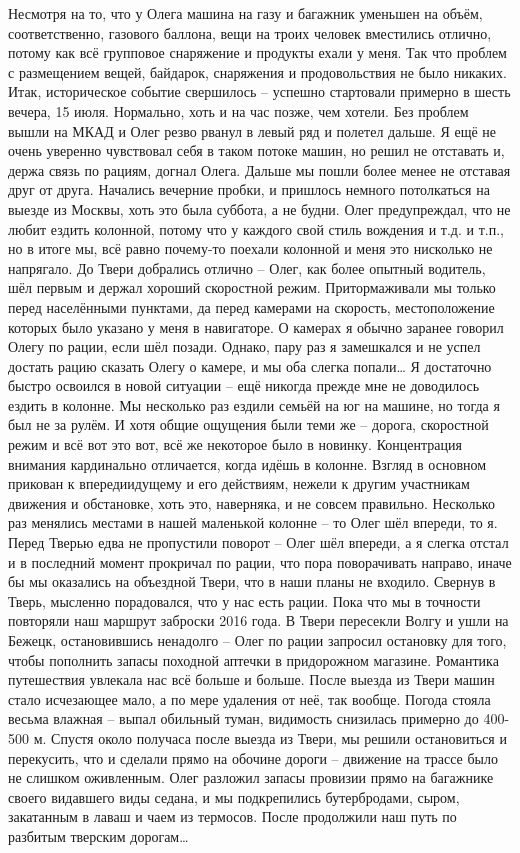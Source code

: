 Несмотря на то, что у Олега машина на газу и багажник уменьшен на объём, соответственно, газового баллона, вещи на троих человек вместились отлично, потому как всё групповое снаряжение и продукты ехали у меня. Так что проблем с размещением вещей, байдарок, снаряжения и продовольствия не было никаких.
Итак, историческое событие свершилось – успешно стартовали примерно в шесть вечера, 15 июля. Нормально, хоть и на час позже, чем хотели. Без проблем вышли на МКАД и Олег резво рванул в левый ряд и полетел дальше. Я ещё не очень уверенно чувствовал себя в таком потоке машин, но решил не отставать и, держа связь по рациям, догнал Олега. Дальше мы пошли более менее не отставая друг от друга. Начались вечерние пробки, и пришлось немного потолкаться на выезде из Москвы, хоть это была суббота, а не будни. Олег предупреждал, что не любит ездить колонной, потому что у каждого свой стиль вождения и т.д. и т.п., но в итоге мы, всё равно почему-то поехали колонной и меня это нисколько не напрягало.
До Твери добрались отлично – Олег, как более опытный водитель, шёл первым и держал хороший скоростной режим. Притормаживали мы только перед населёнными пунктами, да перед камерами на скорость, местоположение которых было указано у меня в навигаторе. О камерах я обычно заранее говорил Олегу по рации, если шёл позади. Однако, пару раз я замешкался и не успел достать рацию сказать Олегу о камере, и мы оба слегка попали… 
Я достаточно быстро освоился в новой ситуации – ещё никогда прежде мне не доводилось ездить в колонне. Мы несколько раз ездили семьёй на юг на машине, но тогда я был не за рулём. И хотя общие ощущения были теми же – дорога, скоростной режим и всё вот это вот, всё же некоторое было в новинку. Концентрация внимания кардинально отличается, когда идёшь в колонне. Взгляд в основном прикован к впередиидущему и его действиям, нежели к другим участникам движения и обстановке, хоть это, наверняка, и не совсем правильно. Несколько раз менялись местами в нашей маленькой колонне – то Олег шёл впереди, то я. Перед Тверью едва не пропустили поворот – Олег шёл впереди, а я слегка отстал и в последний момент прокричал по рации, что пора поворачивать направо, иначе бы мы оказались на объездной Твери, что в наши планы не входило. Свернув в Тверь, мысленно порадовался, что у нас есть рации.
Пока что мы в точности повторяли наш маршрут заброски 2016 года. В Твери пересекли Волгу и ушли на Бежецк, остановившись ненадолго – Олег по рации запросил остановку для того, чтобы пополнить запасы походной аптечки в придорожном магазине. 
Романтика путешествия увлекала нас всё больше и больше. После выезда из Твери машин стало исчезающее мало, а по мере удаления от неё, так вообще. Погода стояла весьма влажная – выпал обильный туман, видимость снизилась примерно до 400-500 м. Спустя около получаса после выезда из Твери, мы решили остановиться и перекусить, что и сделали прямо на обочине дороги – движение на трассе было не слишком оживленным. Олег разложил запасы провизии прямо на багажнике своего видавшего виды седана, и мы подкрепились бутербродами, сыром, закатанным в лаваш и чаем из термосов. После продолжили наш путь по разбитым тверским дорогам…
